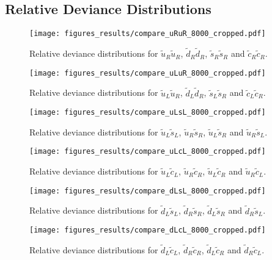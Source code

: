 \documentclass[twoside,english]{uiofysmaster}
\begin{document}
{\begin{appendices}
\chapter{Relative Deviance Distributions}


\begin{figure}
\centering
\texttt{[image: figures\_results/compare\_uRuR\_8000\_cropped.pdf]}
\caption{Relative deviance distributions for $\widetilde{u}_R \widetilde{u}_R$, $\widetilde{d}_R \widetilde{d}_R$, $\widetilde{s}_R \widetilde{s}_R$ and $\widetilde{c}_R \widetilde{c}_R$.}
\end{figure}

\begin{figure}
\centering
\texttt{[image: figures\_results/compare\_uLuR\_8000\_cropped.pdf]}
\caption{Relative deviance distributions for $\widetilde{u}_L \widetilde{u}_R$, $\widetilde{d}_L \widetilde{d}_R$, $\widetilde{s}_L \widetilde{s}_R$ and $\widetilde{c}_L \widetilde{c}_R$.}
\end{figure}

\begin{figure}
\centering
\texttt{[image: figures\_results/compare\_uLsL\_8000\_cropped.pdf]}
\caption{Relative deviance distributions for $\widetilde{u}_L \widetilde{s}_L$, $\widetilde{u}_R \widetilde{s}_R$, $\widetilde{u}_L \widetilde{s}_R$ and $\widetilde{u}_R \widetilde{s}_L$.}
\end{figure}

\begin{figure}
\centering
\texttt{[image: figures\_results/compare\_uLcL\_8000\_cropped.pdf]}
\caption{Relative deviance distributions for $\widetilde{u}_L \widetilde{c}_L$, $\widetilde{u}_R \widetilde{c}_R$, $\widetilde{u}_L \widetilde{c}_R$ and $\widetilde{u}_R \widetilde{c}_L$.}
\end{figure}

\begin{figure}
\centering
\texttt{[image: figures\_results/compare\_dLsL\_8000\_cropped.pdf]}
\caption{Relative deviance distributions for $\widetilde{d}_L \widetilde{s}_L$, $\widetilde{d}_R \widetilde{s}_R$, $\widetilde{d}_L \widetilde{s}_R$ and $\widetilde{d}_R \widetilde{s}_L$.}
\end{figure}

\begin{figure}
\centering
\texttt{[image: figures\_results/compare\_dLcL\_8000\_cropped.pdf]}
\caption{Relative deviance distributions for $\widetilde{d}_L \widetilde{c}_L$, $\widetilde{d}_R \widetilde{c}_R$, $\widetilde{d}_L \widetilde{c}_R$ and $\widetilde{d}_R \widetilde{c}_L$.}
\end{figure}


\end{appendices}}
\end{document}
